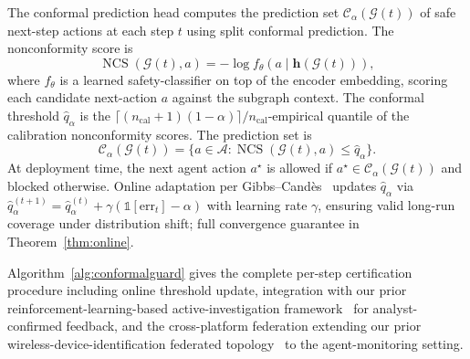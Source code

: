 \documentclass[12pt,a4paper]{article}
\theoremstyle{definition}
\theoremstyle{remark}
\newcommand{\Acal}{\mathcal{A}}
\newcommand{\Ccal}{\mathcal{C}}
\newcommand{\Gcal}{\mathcal{G}}
\DeclareMathOperator{\NCS}{NCS}
\begin{document}
The conformal prediction head computes the prediction set $\Ccal_\alpha(\Gcal(t))$ of safe next-step actions at each step $t$ using split conformal prediction. The nonconformity score is
\begin{equation}
    \NCS(\Gcal(t), a) = -\log f_{\theta}(a \mid \mathbf{h}(\Gcal(t))),
\label{eq:ncs}
\end{equation}
where $f_\theta$ is a learned safety-classifier on top of the encoder embedding, scoring each candidate next-action $a$ against the subgraph context. The conformal threshold $\hat{q}_\alpha$ is the $\lceil (n_{\mathrm{cal}} + 1)(1 - \alpha) \rceil / n_{\mathrm{cal}}$-empirical quantile of the calibration nonconformity scores. The prediction set is
\begin{equation}
    \Ccal_\alpha(\Gcal(t)) = \{a \in \Acal : \NCS(\Gcal(t), a) \leq \hat{q}_\alpha\}.
\label{eq:predset}
\end{equation}
At deployment time, the next agent action $a^{\star}$ is allowed if $a^{\star} \in \Ccal_\alpha(\Gcal(t))$ and blocked otherwise. Online adaptation per Gibbs--Cand\`es~\cite{gibbs2021adaptive} updates $\hat{q}_\alpha$ via $\hat{q}_\alpha^{(t+1)} = \hat{q}_\alpha^{(t)} + \gamma (\mathbb{1}[\mathrm{err}_t] - \alpha)$ with learning rate $\gamma$, ensuring valid long-run coverage under distribution shift; full convergence guarantee in Theorem~\ref{thm:online}.

Algorithm~\ref{alg:conformalguard} gives the complete per-step certification procedure including online threshold update, integration with our prior reinforcement-learning-based active-investigation framework~\cite{anaedevha2025dqn} for analyst-confirmed feedback, and the cross-platform federation extending our prior wireless-device-identification federated topology~\cite{anaedevha2024wireless} to the agent-monitoring setting.
\end{document}
